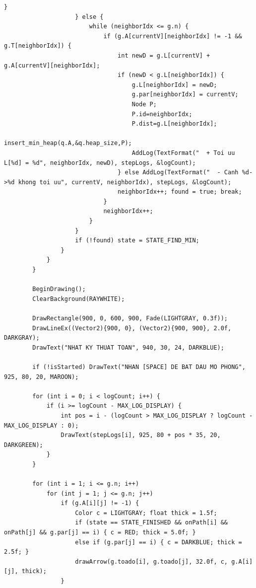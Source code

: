 \documentclass[12pt,a4paper,oneside]{report}
\begin{document}
\begin{lstlisting}[style=UserCStyle]
                        }
                    } else {
                        while (neighborIdx <= g.n) {
                            if (g.A[currentV][neighborIdx] != -1 && g.T[neighborIdx]) {
                                int newD = g.L[currentV] + g.A[currentV][neighborIdx];
                                if (newD < g.L[neighborIdx]) {
                                    g.L[neighborIdx] = newD;
                                    g.par[neighborIdx] = currentV;
                                    Node P;
                                    P.id=neighborIdx;
                                    P.dist=g.L[neighborIdx];
                                    insert_min_heap(q.A,&q.heap_size,P);
                                    AddLog(TextFormat("  + Toi uu L[%d] = %d", neighborIdx, newD), stepLogs, &logCount);
                                } else AddLog(TextFormat("  - Canh %d->%d khong toi uu", currentV, neighborIdx), stepLogs, &logCount);
                                neighborIdx++; found = true; break;
                            }
                            neighborIdx++;
                        }
                    }
                    if (!found) state = STATE_FIND_MIN;
                }
            }
        }

        BeginDrawing();
        ClearBackground(RAYWHITE);

        DrawRectangle(900, 0, 600, 900, Fade(LIGHTGRAY, 0.3f));
        DrawLineEx((Vector2){900, 0}, (Vector2){900, 900}, 2.0f, DARKGRAY);
        DrawText("NHAT KY THUAT TOAN", 940, 30, 24, DARKBLUE);
        
        if (!isStarted) DrawText("NHAN [SPACE] DE BAT DAU MO PHONG", 925, 80, 20, MAROON);

        for (int i = 0; i < logCount; i++) {
            if (i >= logCount - MAX_LOG_DISPLAY) {
                int pos = i - (logCount > MAX_LOG_DISPLAY ? logCount - MAX_LOG_DISPLAY : 0);
                DrawText(stepLogs[i], 925, 80 + pos * 35, 20, DARKGREEN);
            }
        }

        for (int i = 1; i <= g.n; i++)
            for (int j = 1; j <= g.n; j++)
                if (g.A[i][j] != -1) {
                    Color c = LIGHTGRAY; float thick = 1.5f;
                    if (state == STATE_FINISHED && onPath[i] && onPath[j] && g.par[j] == i) { c = RED; thick = 5.0f; }
                    else if (g.par[j] == i) { c = DARKBLUE; thick = 2.5f; }
                    drawArrow(g.toado[i], g.toado[j], 32.0f, c, g.A[i][j], thick);
                }


\end{lstlisting}
\end{document}
